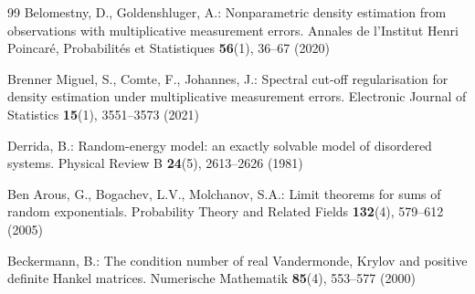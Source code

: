 \documentclass[sn-mathphys-num]{sn-jnl}
\theoremstyle{thmstyleone}%
\theoremstyle{thmstyletwo}%
\theoremstyle{thmstylethree}%
\theoremstyle{thmstyleone}%
\begin{document}
\begin{thebibliography}{99}
		Belomestny, D., Goldenshluger, A.: Nonparametric density
		estimation from observations with multiplicative measurement
		errors. Annales de l'Institut Henri Poincar\'e, Probabilit\'es
		et Statistiques \textbf{56}(1), 36--67 (2020)
		
		Brenner Miguel, S., Comte, F., Johannes, J.: Spectral cut-off
		regularisation for density estimation under multiplicative
		measurement errors. Electronic Journal of Statistics
		\textbf{15}(1), 3551--3573 (2021)
		
		Derrida, B.: Random-energy model: an exactly solvable model of
		disordered systems. Physical Review B \textbf{24}(5),
		2613--2626 (1981)
		
		Ben Arous, G., Bogachev, L.V., Molchanov, S.A.: Limit theorems
		for sums of random exponentials. Probability Theory and Related
		Fields \textbf{132}(4), 579--612 (2005)
		
		Beckermann, B.: The condition number of real Vandermonde,
		Krylov and positive definite Hankel matrices. Numerische
		Mathematik \textbf{85}(4), 553--577 (2000)
		
	\end{thebibliography}
	
	\clearpage
	
\end{document}
